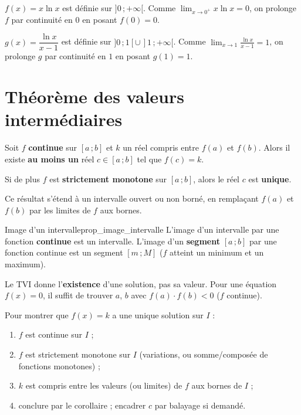 \begin{exemple}
	$f(x)=x\ln x$ est définie sur $]0\,;+\infty[$. Comme
	$\displaystyle\lim_{x\to 0^+}x\ln x=0$, on prolonge $f$ par continuité en $0$
	en posant $f(0)=0$.
\end{exemple}

\begin{exemple}
	$g(x)=\dfrac{\ln x}{x-1}$ est définie sur $]0\,;1[\cup\,]1\,;+\infty[$.
	Comme $\displaystyle\lim_{x\to 1}\frac{\ln x}{x-1}=1$, on prolonge $g$ par
	continuité en $1$ en posant $g(1)=1$.
\end{exemple}


\section{Théorème des valeurs intermédiaires}

\begin{theoreme}[TVI]
	Soit $f$ \textbf{continue} sur $[a\,;b]$ et $k$ un réel compris entre $f(a)$
	et $f(b)$. Alors il existe \textbf{au moins un} réel $c\in[a\,;b]$ tel que
	$f(c)=k$.
\end{theoreme}

\begin{theoreme}
	Si de plus $f$ est \textbf{strictement monotone} sur $[a\,;b]$, alors le réel
	$c$ est \textbf{unique}.

	Ce résultat s'étend à un intervalle ouvert ou non borné, en remplaçant
	$f(a)$ et $f(b)$ par les limites de $f$ aux bornes.
\end{theoreme}

\begin{propriete}{Image d'un intervalle}{prop_image_intervalle}
	L'image d'un intervalle par une fonction \textbf{continue} est un intervalle.
	L'image d'un \textbf{segment} $[a\,;b]$ par une fonction continue est un
	segment $[m\,;M]$ ($f$ atteint un minimum et un maximum).
\end{propriete}

\begin{attention}
	Le TVI donne l'\textbf{existence} d'une solution, pas sa valeur. Pour une
	équation $f(x)=0$, il suffit de trouver $a$, $b$ avec
	$f(a)\cdot f(b)<0$ ($f$ continue).
\end{attention}

\begin{methode}
	Pour montrer que $f(x)=k$ a une unique solution sur $I$ :
	\begin{enumerate}
		\item $f$ est continue sur $I$ ;
		\item $f$ est strictement monotone sur $I$ (variations, ou somme/composée
		de fonctions monotones) ;
		\item $k$ est compris entre les valeurs (ou limites) de $f$ aux bornes de $I$ ;
		\item conclure par le corollaire ; encadrer $c$ par balayage si demandé.
	\end{enumerate}
\end{methode}

